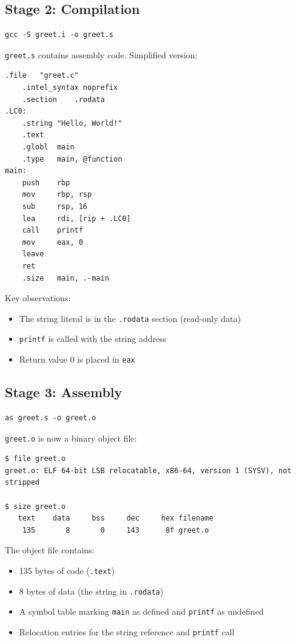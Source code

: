 \subsection{Stage 2: Compilation}

\begin{verbatim}
gcc -S greet.i -o greet.s
\end{verbatim}

\texttt{greet.s} contains assembly code. Simplified version:

\begin{lstlisting}[language={[x86masm]Assembler}]
    .file   "greet.c"
    .intel_syntax noprefix
    .section    .rodata
.LC0:
    .string "Hello, World!"
    .text
    .globl  main
    .type   main, @function
main:
    push    rbp
    mov     rbp, rsp
    sub     rsp, 16
    lea     rdi, [rip + .LC0]
    call    printf
    mov     eax, 0
    leave
    ret
    .size   main, .-main
\end{lstlisting}

Key observations:
\begin{itemize}
    \item The string literal is in the \texttt{.rodata} section (read-only data)
    \item \texttt{printf} is called with the string address
    \item Return value 0 is placed in \texttt{eax}
\end{itemize}

\subsection{Stage 3: Assembly}

\begin{verbatim}
as greet.s -o greet.o
\end{verbatim}

\texttt{greet.o} is now a binary object file:

\begin{verbatim}
$ file greet.o
greet.o: ELF 64-bit LSB relocatable, x86-64, version 1 (SYSV), not stripped

$ size greet.o
   text    data     bss     dec     hex filename
    135       8       0     143      8f greet.o
\end{verbatim}

The object file contains:
\begin{itemize}
    \item 135 bytes of code (\texttt{.text})
    \item 8 bytes of data (the string in \texttt{.rodata})
    \item A symbol table marking \texttt{main} as defined and \texttt{printf} as undefined
    \item Relocation entries for the string reference and \texttt{printf} call
\end{itemize}

